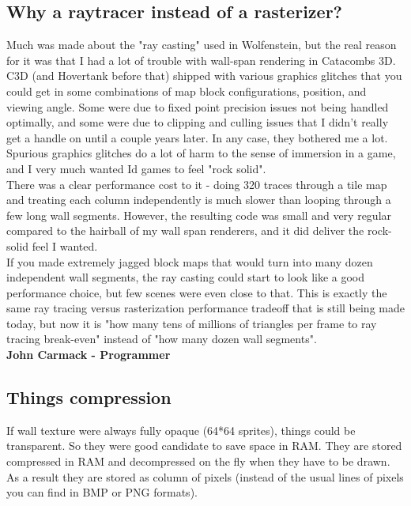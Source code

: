   
  
\subsection{Why a raytracer instead of a rasterizer?} 
\begin{fancyquotes}
Much was made about the "ray casting" used in Wolfenstein, but the real reason for it was that I had a lot of trouble with wall-span rendering in Catacombs 3D.  C3D (and Hovertank before that) shipped with various graphics glitches that you could get in some combinations of map block configurations, position, and viewing angle.  Some were due to fixed point precision issues not being handled optimally, and some were due to clipping and culling issues that I didn't really get a handle on until a couple years later.  In any case, they bothered me a lot.  Spurious graphics glitches do a lot of harm to the sense of immersion in a game, and I very much wanted Id games to feel "rock solid".
 \bigskip \\
There was a clear performance cost to it - doing 320 traces through a tile map and treating each column independently is much slower than looping through a few long wall segments.  However, the resulting code was small and very regular compared to the hairball of my wall span renderers, and it did deliver the rock-solid feel I wanted.
 \bigskip \\
If you made extremely jagged block maps that would turn into many dozen independent wall segments, the ray casting could start to look like a good performance choice, but few scenes were even close to that.  This is exactly the same ray tracing versus rasterization performance tradeoff that is still being made today, but now it is "how many tens of millions of triangles per frame to ray tracing break-even" instead of "how many dozen wall segments".
 \bigskip \\
\textbf{John Carmack - Programmer}
 \end{fancyquotes}
 
 
 
 
 
 
 
 \subsection{Things compression}
 If wall texture were always fully opaque (64*64 sprites), things could be transparent. So they were good candidate to save space in RAM. They are stored compressed in RAM and decompressed on the fly when they have to be drawn. As a result they are stored as column of pixels (instead of the usual lines of pixels you can find in BMP or PNG formats).
 
